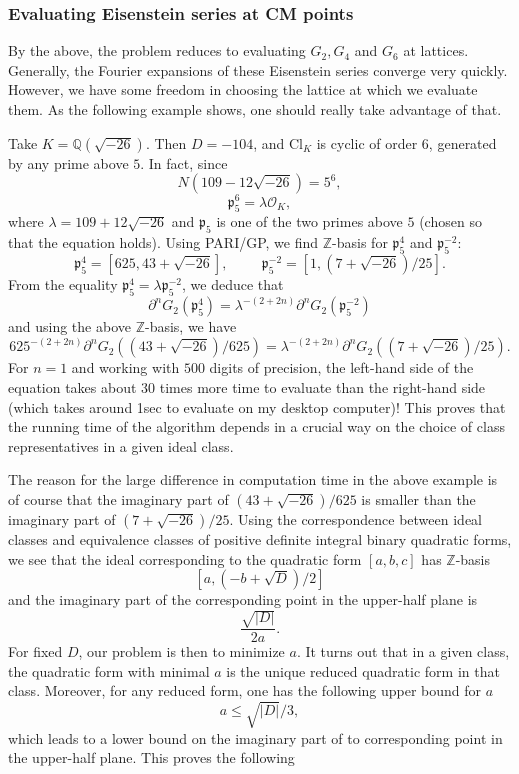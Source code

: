 \documentclass[twoside,10pt]{article}
\newcommand{\Z}{\mathbb{Z}}
\newcommand{\Q}{\mathbb{Q}}
\newcommand{\p}{\mathfrak{p}}
\newcommand{\del}{\partial}
\newcommand{\Clk}{\text{Cl}_K}
\renewcommand{\O}{\mathcal{O}}
\begin{document}

\subsubsection{Evaluating Eisenstein series at CM points}
By the above, the problem reduces to evaluating $G_2,G_4$ and $G_6$ at lattices. Generally, the Fourier expansions of these Eisenstein series converge very quickly. However, we have some freedom in choosing the lattice at which we evaluate them. As the following example shows, one should really take advantage of that.

Take $K=\Q(\sqrt{-26})$. Then $D=-104$, and $\Clk$ is cyclic of order $6$, generated by any prime above $5$. In fact, since
\[N(109-12\sqrt{-26})=5^6,\]
\[\p_5^6=\lambda\O_K,\]
where $\lambda=109+12\sqrt{-26}$ and $\p_5$ is one of the two primes above $5$ (chosen so that the equation holds). Using PARI/GP, we find $\Z$-basis for $\p_5^4$  and $\p_5^{-2}$:
\[\p_5^4=[625,43+\sqrt{-26}],\hspace{1cm}\p_5^{-2}=[1,(7+\sqrt{-26})/25].\]
From the equality $\p_5^4=\lambda\p_5^{-2}$, we deduce that
\[\del^{n}G_2(\p_5^4)=\lambda^{-(2+2n)}\del^{n}G_2(\p_5^{-2})\]
and using the above $\Z$-basis, we have
\[625^{-(2+2n)}\del^nG_2((43+\sqrt{-26})/625)=\lambda^{-(2+2n)}\del^n G_2((7+\sqrt{-26})/25).\]
For $n=1$ and working with $500$ digits of precision, the left-hand side of the equation takes about $30$ times more time to evaluate than the right-hand side (which takes around 1sec to evaluate on my desktop computer)! This proves that the running time of the algorithm depends in a crucial way on the choice of class representatives in a given ideal class.

The reason for the large difference in computation time in the above example is of course that the imaginary part of $(43+\sqrt{-26})/625$ is smaller than the imaginary part of $(7+\sqrt{-26})/25$. Using the correspondence between ideal classes and equivalence classes of positive definite integral binary quadratic forms, we see that the ideal corresponding to the quadratic form $[a,b,c]$ has $\Z$-basis
\[[a,(-b+\sqrt{D})/2]\]
and the imaginary part of the corresponding point in the upper-half plane is
\[\frac{\sqrt{|D|}}{2a}.\]
For fixed $D$, our problem is then to minimize $a$. It turns out that in a given class, the quadratic form with minimal $a$ is the unique reduced quadratic form in that class. Moreover, for any reduced form, one has the following upper bound for $a$
\[a\leq \sqrt{|D|}/3,\]
which leads to a lower bound on the imaginary part of to corresponding point in the upper-half plane. This proves the following
\end{document}
